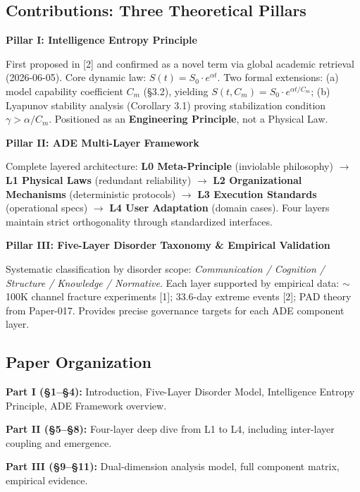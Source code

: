 \documentclass[11pt,a4paper]{article}
\begin{document}
\subsection{Contributions: Three Theoretical Pillars}
\label{sec:contributions}

\textbf{Pillar I: Intelligence Entropy Principle}

First proposed in [2] and confirmed as a novel term via global academic retrieval (2026-06-05). Core dynamic law: $S(t) = S_0 \cdot e^{\alpha t}$. Two formal extensions: (a) model capability coefficient $C_m$ (\S3.2), yielding $S(t, C_m) = S_0 \cdot e^{\alpha t/C_m}$; (b) Lyapunov stability analysis (Corollary 3.1) proving stabilization condition $\gamma > \alpha/C_m$. Positioned as an \textbf{Engineering Principle}, not a Physical Law.

\textbf{Pillar II: ADE Multi-Layer Framework}

Complete layered architecture: \textbf{L0 Meta-Principle} (inviolable philosophy) $\rightarrow$ \textbf{L1 Physical Laws} (redundant reliability) $\rightarrow$ \textbf{L2 Organizational Mechanisms} (deterministic protocols) $\rightarrow$ \textbf{L3 Execution Standards} (operational specs) $\rightarrow$ \textbf{L4 User Adaptation} (domain cases). Four layers maintain strict orthogonality through standardized interfaces.

\textbf{Pillar III: Five-Layer Disorder Taxonomy \& Empirical Validation}

Systematic classification by disorder scope: \emph{Communication / Cognition / Structure / Knowledge / Normative}. Each layer supported by empirical data: $\sim$100K channel fracture experiments [1]; 33.6-day extreme events [2]; PAD theory from Paper-017. Provides precise governance targets for each ADE component layer.

\subsection{Paper Organization}
\label{sec:organization}

\textbf{Part I (\S1--\S4):} Introduction, Five-Layer Disorder Model, Intelligence Entropy Principle, ADE Framework overview.

\textbf{Part II (\S5--\S8):} Four-layer deep dive from L1 to L4, including inter-layer coupling and emergence.

\textbf{Part III (\S9--\S11):} Dual-dimension analysis model, full component matrix, empirical evidence.
\end{document}
